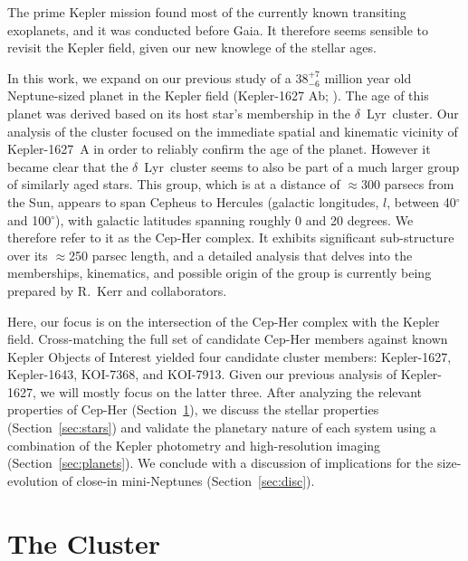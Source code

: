 \documentclass[12pt,twocolumn,linenumbers]{aastex63}
\begin{document}
The prime Kepler mission \citep{borucki_kepler_2010} found most of the
currently known transiting exoplanets, and it was conducted before
Gaia.  It therefore seems sensible to revisit the Kepler field, given
our new knowlege of the stellar ages.

In this work, we expand on our previous study of a $38^{+7}_{-6}$
million year old Neptune-sized planet in the Kepler field (Kepler-1627
Ab; \citealt{bouma_kep1627_2022}).  The age of this planet was derived
based on its host star's membership in the $\delta$\ Lyr\ cluster.
Our analysis of the cluster focused on the immediate spatial and
kinematic vicinity of Kepler-1627~A in order to reliably confirm the
age of the planet.  However it became clear that the $\delta$\ Lyr\
cluster seems to also be part of a much larger group of similarly aged
stars.  This group, which is at a distance of $\approx$300 parsecs
from the Sun, appears to span Cepheus to Hercules (galactic
longitudes, $l$, between 40$^\circ$ and 100$^\circ$), with galactic
latitudes spanning roughly 0 and 20 degrees.  We therefore refer to it
as the Cep-Her complex.  It exhibits significant sub-structure over
its $\approx$250 parsec length, and a detailed analysis that delves
into the memberships, kinematics, and possible origin of the group is
currently being prepared by R.~Kerr and collaborators.

Here, our focus is on the intersection of the Cep-Her complex with the
Kepler field.  Cross-matching the full set of candidate Cep-Her
members against known Kepler Objects of Interest
\citep{thompson_planetary_2018} yielded four candidate cluster
members: Kepler-1627, Kepler-1643, KOI-7368, and KOI-7913.  Given our
previous analysis of Kepler-1627, we will mostly focus on the latter
three.  After analyzing the relevant properties of Cep-Her
(Section~\ref{sec:cluster}), we discuss the stellar properties
(Section~\ref{sec:stars}) and validate the planetary nature of each
system using a combination of the Kepler photometry and
high-resolution imaging (Section~\ref{sec:planets}).  We conclude with
a discussion of implications for the size-evolution of close-in
mini-Neptunes (Section~\ref{sec:disc}).

\section{The Cluster}
\label{sec:cluster}
\end{document}
